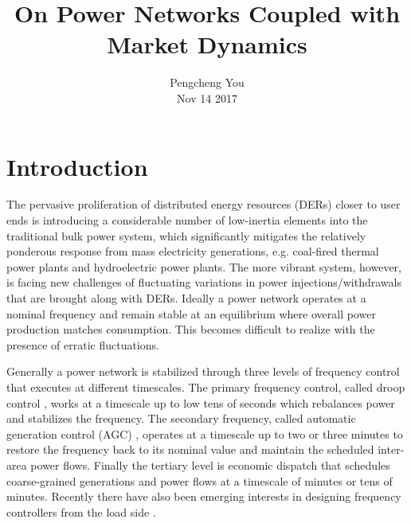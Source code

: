 \documentclass[journal,12pt,onecolumn,draftclsnofoot]{IEEEtran}
\begin{document}
\title{\Large On Power Networks Coupled with Market Dynamics}


\author{Pengcheng You \\  Nov 14 2017%
}


\maketitle


%

%
%


\IEEEpeerreviewmaketitle

\section{Introduction}

The pervasive proliferation of distributed energy resources (DERs) closer to user ends is introducing a considerable number of low-inertia elements into the traditional bulk power system, which significantly mitigates the relatively ponderous response from mass electricity generations, e.g. coal-fired thermal power plants and hydroelectric power plants. The more vibrant system, however, is facing new challenges of fluctuating variations in power injections/withdrawals that are brought along with DERs. Ideally a power network operates at a nominal frequency and remain stable at an equilibrium where overall power production matches consumption. This becomes difficult to realize with the presence of erratic fluctuations. 

Generally a power network is stabilized through three levels of frequency control that executes at different timescales. The primary frequency control, called droop control \cite{zhao2016unified}, works at a timescale up to low tens of seconds which rebalances power and stabilizes the frequency. The secondary frequency, called automatic generation control (AGC) \cite{li2016connecting}, operates at a timescale up to two or three minutes to restore the frequency back to its nominal value and maintain the scheduled inter-area power flows. Finally the tertiary level is economic dispatch that schedules coarse-grained generations and power flows at a timescale of minutes or tens of minutes. Recently there have also been emerging interests in designing frequency controllers from the load side \cite{zhao2014design,mallada2017optimal}. 
\end{document}
